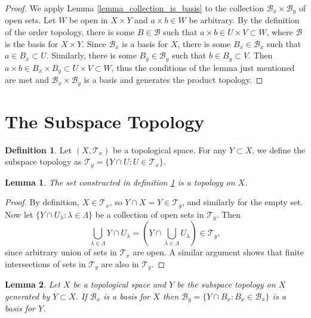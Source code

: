 \documentclass{report}
\newtheorem{lemma}{Lemma}[section]
\theoremstyle{definition}
\newtheorem{definition}{Definition}[section]
\theoremstyle{remark}
\newcommand{\paren}[1]{\left( #1 \right)}
\newcommand{\set}[1]{\{#1\}}
\newcommand{\prt}[1]{\mathcal{#1}}
\begin{document}
\begin{proof}
    We apply Lemma \ref{lemma_collection_is_basis} to the collection $\prt{B}_x \times \prt{B}_y$ of open sets. Let $W$ be open in $X \times Y$ and $a \times b \in W$ be arbitrary. By the definition of the order topology, there is some $B \in \prt{B}$ such that $a \times b \in U \times V \subset W$, where $\prt{B}$ is the basis for $X \times Y$. Since $\prt{B}_x$ is a basis for $X$, there is some $B_x \in \prt{B}_x$ such that $a \in B_x \subset U$. Similarly, there is some $B_y \in \prt{B}_y$ such that $b \in B_y \subset V$. Then $a \times b \in B_x \times B_y \subset U \times V \subset W$, thus the conditions of the lemma just mentioned are met and $\prt{B}_x \times \prt{B}_y$ is a basis and generates the product topology.
\end{proof}

\section{The Subspace Topology}

\begin{definition}\label{def_subspace_topology}
    Let $(X, \prt{T}_x)$ be a topological space. For any $Y \subset X$, we define the subspace topology as $\prt{T}_y = \set{Y \cap U : U \in \prt{T}_x}$.
\end{definition}

\begin{lemma}
    The set constructed in definition \ref{def_subspace_topology} is a topology on $X$.
\end{lemma}

\begin{proof}
    By definition, $X \in \prt{T}_x$, so $Y \cap X = Y \in \prt{T}_y$, and similarly for the empty set. Now let $\set{Y \cap U_\lambda : \lambda \in \Lambda}$ be a collection of open sets in $\prt{T}_y$. Then 
    \begin{equation*}
        \bigcup_{\lambda \in \Lambda} Y \cap U_{\lambda} = \paren{Y \cap  \bigcup_{\lambda \in \Lambda} U_{\lambda}} \in \prt{T}_y, 
    \end{equation*} since arbitrary union of sets in $\prt{T}_x$ are open. A similar argument shows that finite intersections of sets in $\prt{T}_y$ are also in $\prt{T}_y$.
\end{proof}

\begin{lemma}
    Let $X$ be a topological space and $Y$ be the subspace topology on $X$ generated by $Y \subset X$. If $\prt{B}_x$ is a basis for $X$ then $\prt{B}_y = \set{Y \cap B_x : B_x \in \prt{B}_x}$ is a basis for $Y$.
\end{lemma}
\end{document}
